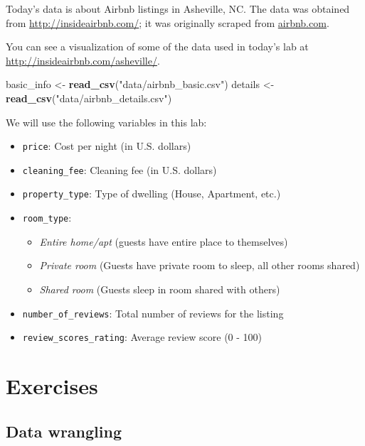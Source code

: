 \documentclass[]{book}
\newenvironment{Shaded}{\begin{snugshade}}{\end{snugshade}}
\newcommand{\KeywordTok}[1]{\textcolor[rgb]{0.13,0.29,0.53}{\textbf{#1}}}
\newcommand{\StringTok}[1]{\textcolor[rgb]{0.31,0.60,0.02}{#1}}
\newcommand{\NormalTok}[1]{#1}
\providecommand{\tightlist}{%
  \setlength{\itemsep}{0pt}\setlength{\parskip}{0pt}}
\begin{document}
Today's data is about Airbnb listings in Asheville, NC. The data was
obtained from
\href{http://insideairbnb.com/index.html}{http://insideairbnb.com/}; it
was originally scraped from \href{https://www.airbnb.com/}{airbnb.com}.

You can see a visualization of some of the data used in today's lab at
\url{http://insideairbnb.com/asheville/}.

\begin{Shaded}
\begin{Highlighting}[]
\NormalTok{basic_info <-}\StringTok{ }\KeywordTok{read_csv}\NormalTok{(}\StringTok{"data/airbnb_basic.csv"}\NormalTok{)}
\NormalTok{details <-}\StringTok{ }\KeywordTok{read_csv}\NormalTok{(}\StringTok{"data/airbnb_details.csv"}\NormalTok{)}
\end{Highlighting}
\end{Shaded}

We will use the following variables in this lab:

\begin{itemize}
\tightlist
\item
  \texttt{price}: Cost per night (in U.S. dollars)
\item
  \texttt{cleaning\_fee}: Cleaning fee (in U.S. dollars)
\item
  \texttt{property\_type}: Type of dwelling (House, Apartment, etc.)
\item
  \texttt{room\_type}:

  \begin{itemize}
  \tightlist
  \item
    \emph{Entire home/apt} (guests have entire place to themselves)
  \item
    \emph{Private room} (Guests have private room to sleep, all other
    rooms shared)
  \item
    \emph{Shared room} (Guests sleep in room shared with others)
  \end{itemize}
\item
  \texttt{number\_of\_reviews}: Total number of reviews for the listing
\item
  \texttt{review\_scores\_rating}: Average review score (0 - 100)
\end{itemize}

\section{Exercises}\label{exercises-4}

\subsection{Data wrangling}\label{data-wrangling}
\end{document}
